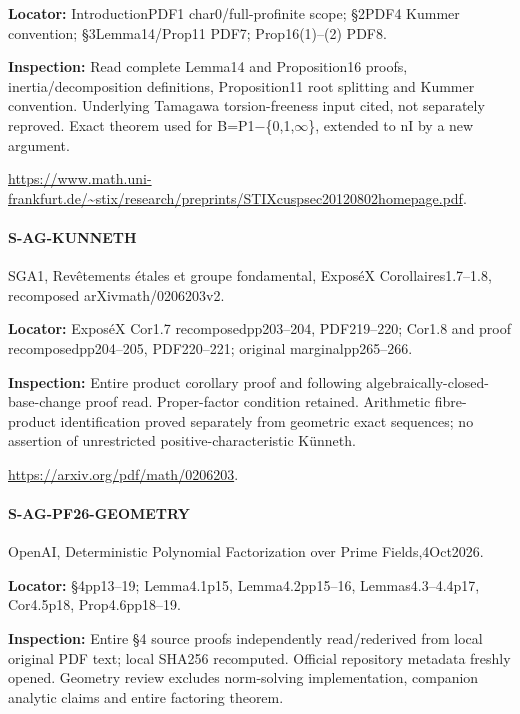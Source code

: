 \documentclass[11pt,a4paper]{article}
\begin{document}
\textbf{Locator:} IntroductionPDF1 char0/\allowbreak{}full-profinite scope; §2PDF4 Kummer convention; §3Lemma14/\allowbreak{}Prop11 PDF7; Prop16(1)–\allowbreak{}(2) PDF8.

\textbf{Inspection:} Read complete Lemma14 and Proposition16 proofs, inertia/\allowbreak{}decomposition definitions, Proposition11 root splitting and Kummer convention.\allowbreak{} Underlying Tamagawa torsion-freeness input cited, not separately reproved.\allowbreak{} Exact theorem used for B=P1\ensuremath{-}\{0,1,\ensuremath{\infty}\}, extended to nI by a new argument.\allowbreak{}

\url{https://www.math.uni-frankfurt.de/~stix/research/preprints/STIXcuspsec20120802homepage.pdf}.

\paragraph{S-AG-KUNNETH} SGA1, Revêtements étales et groupe fondamental, ExposéX Corollaires1.\allowbreak{}7–\allowbreak{}1.\allowbreak{}8, recomposed arXivmath/\allowbreak{}0206203v2.

\textbf{Locator:} ExposéX Cor1.\allowbreak{}7 recomposedpp203–\allowbreak{}204, PDF219–\allowbreak{}220; Cor1.\allowbreak{}8 and proof recomposedpp204–\allowbreak{}205, PDF220–\allowbreak{}221; original marginalpp265–\allowbreak{}266.

\textbf{Inspection:} Entire product corollary proof and following algebraically-closed-base-change proof read.\allowbreak{} Proper-factor condition retained.\allowbreak{} Arithmetic fibre-product identification proved separately from geometric exact sequences; no assertion of unrestricted positive-characteristic Künneth.\allowbreak{}

\url{https://arxiv.org/pdf/math/0206203}.

\paragraph{S-AG-PF26-GEOMETRY} OpenAI, Deterministic Polynomial Factorization over Prime Fields,4Oct2026.

\textbf{Locator:} §4pp13–\allowbreak{}19; Lemma4.\allowbreak{}1p15, Lemma4.\allowbreak{}2pp15–\allowbreak{}16, Lemmas4.\allowbreak{}3–\allowbreak{}4.\allowbreak{}4p17, Cor4.\allowbreak{}5p18, Prop4.\allowbreak{}6pp18–\allowbreak{}19.

\textbf{Inspection:} Entire §4 source proofs independently read/\allowbreak{}rederived from local original PDF text; local SHA256 recomputed.\allowbreak{} Official repository metadata freshly opened.\allowbreak{} Geometry review excludes norm-solving implementation, companion analytic claims and entire factoring theorem.\allowbreak{}
\end{document}
